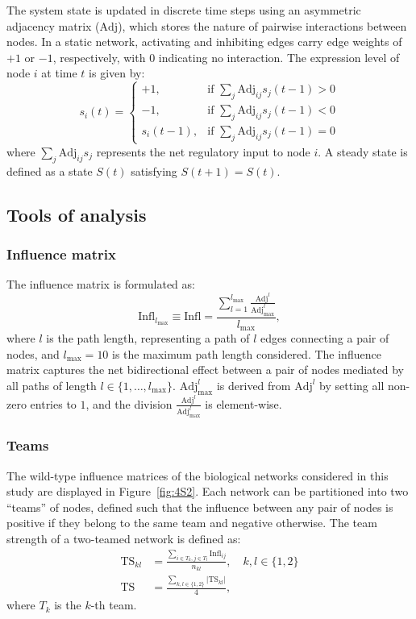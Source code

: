 \documentclass[11pt]{article}
\newcommand{\ts}{\mathrm{TS}}
\newcommand{\inm}{\mathrm{Infl}}
\newcommand{\adj}{\mathrm{Adj}}
\begin{document}
The system state is updated in discrete time steps using an asymmetric adjacency matrix ($\adj$), which stores the nature of pairwise interactions between nodes. In a static network, activating and inhibiting edges carry edge weights of $+1$ or $-1$, respectively, with $0$ indicating no interaction. The expression level of node $i$ at time $t$ is given by:
\begin{equation} \label{eq:bool}
    s_i(t) = 
\begin{cases}
    +1, & \text{if } \sum_j \adj_{ij} s_j(t-1) > 0 \\
    -1, & \text{if } \sum_j \adj_{ij} s_j(t-1) < 0 \\
    s_i(t-1), & \text{if } \sum_j \adj_{ij} s_j(t-1) = 0
\end{cases}
\end{equation}
where $\sum_j \adj_{ij} s_j$ represents the net regulatory input to node $i$. A steady state is defined as a state $S(t)$ satisfying $S(t+1) = S(t)$.

\subsection{Tools of analysis}

\subsubsection{Influence matrix}
The influence matrix is formulated as:
\begin{equation}
    \inm_{l_\mathrm{max}} \equiv \inm = \frac{\sum_{l=1}^{l_\mathrm{max}} \frac{\adj^l}{\adj_{\mathrm{max}}^l}}{l_\mathrm{max}},
\end{equation}
where $l$ is the path length, representing a path of $l$ edges connecting a pair of nodes, and $l_\mathrm{max} = 10$ is the maximum path length considered. The influence matrix captures the net bidirectional effect between a pair of nodes mediated by all paths of length $l \in \{1, \ldots, l_\mathrm{max}\}$. $\adj_{\mathrm{max}}^l$ is derived from $\adj^l$ by setting all non-zero entries to $1$, and the division $\frac{\adj^l}{\adj_{\mathrm{max}}^l}$ is element-wise.

\subsubsection{Teams}
The wild-type influence matrices of the biological networks considered in this study are displayed in Figure~\ref{fig:4S2}. Each network can be partitioned into two ``teams'' of nodes, defined such that the influence between any pair of nodes is positive if they belong to the same team and negative otherwise. The team strength of a two-teamed network is defined as:
\begin{align} \label{eq:ts_def}
    \ts_{kl} &= \frac{\sum_{i \in T_k, j \in T_l} \inm_{ij}}{n_{kl}}, \quad k, l \in \{1, 2\} \\
    \ts &= \frac{\sum_{k,l \in \{1,2\}} |\ts_{kl}|}{4},
\end{align}
where $T_k$ is the $k$-th team.
\end{document}
